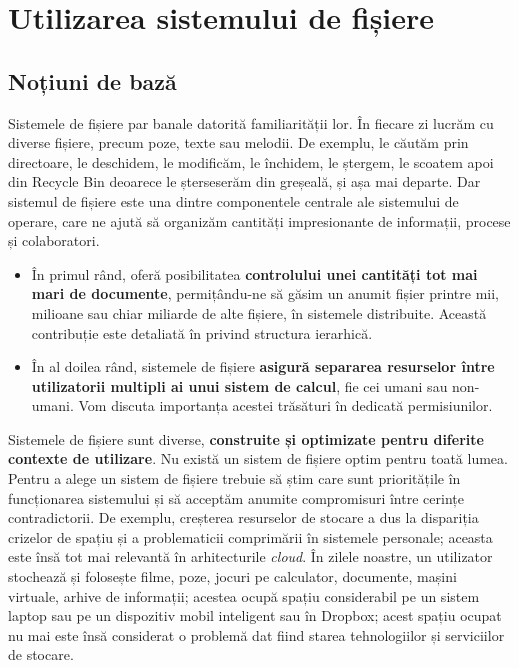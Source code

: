 \chapter{Utilizarea sistemului de fișiere}
\label{chapter:file-system}

\section{Noțiuni de bază}
\label{sec:file-system-baza}

Sistemele de fișiere par banale datorită familiarității lor. În fiecare zi
lucrăm cu diverse fișiere, precum poze, texte sau melodii. De exemplu, le
căutăm prin directoare, le deschidem, le modificăm, le închidem, le ștergem, le
scoatem apoi din Recycle Bin deoarece le șterseserăm din greșeală, și așa mai
departe. Dar sistemul de fișiere este una dintre componentele centrale ale
sistemului de operare, care ne ajută să organizăm cantități
impresionante de informații, procese și colaboratori.

\begin{itemize}
	\item În primul rând, oferă posibilitatea \textbf{controlului unei
		cantități tot mai mari de documente}, permițându-ne să găsim un
		anumit fișier printre mii, milioane sau chiar miliarde de alte
		fișiere, în sistemele distribuite. Această contribuție este
		detaliată în 
		privind structura ierarhică.
	\item În al doilea rând, sistemele de fișiere \textbf{asigură separarea
		resurselor între utilizatorii multipli ai unui sistem de
		calcul}, fie cei umani sau non-umani. Vom discuta importanța
		acestei trăsături în 
		dedicată permisiunilor.
\end{itemize}

Sistemele de fișiere sunt diverse, \textbf{construite și optimizate pentru
diferite contexte de utilizare}. Nu există un sistem de fișiere
optim pentru toată lumea. Pentru a alege un sistem de fișiere trebuie să știm
care sunt prioritățile în funcționarea sistemului și să acceptăm anumite
compromisuri între cerințe contradictorii. De exemplu, creșterea resurselor de
stocare a dus la dispariția crizelor de spațiu și a problematicii comprimării în
sistemele personale; aceasta este însă tot mai relevantă în arhitecturile
\textit{cloud}. În zilele noastre, un utilizator stochează și folosește filme, poze, jocuri pe calculator, documente, mașini virtuale, arhive de informații; acestea ocupă spațiu considerabil pe un sistem laptop sau pe un dispozitiv mobil inteligent sau în Dropbox; acest spațiu ocupat nu mai este însă considerat o problemă dat fiind starea tehnologiilor și serviciilor de stocare.

